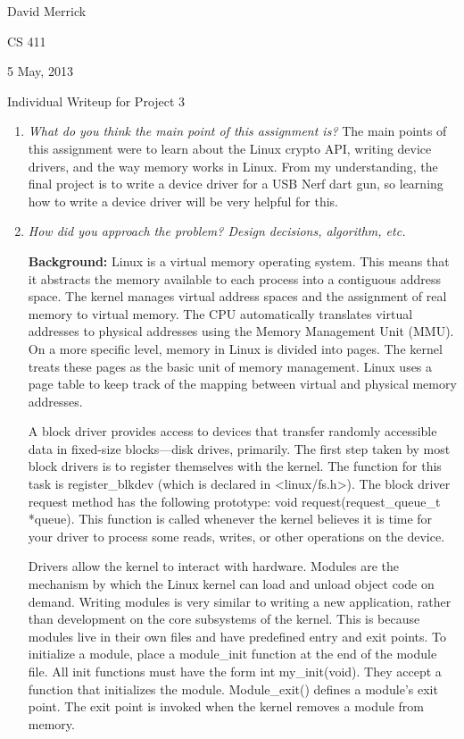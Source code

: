 \documentclass[letterpaper,10pt,titlepage]{article}
\newcommand{\ignore}[2]{\hspace{0in}#2} %
\newcommand{\tab}{\hspace*{2em}} %
\def\name{David Merrick}
\def\project{Project 3}
\def\date{5 May, 2013}
\begin{document}
\name

CS 411

\date

\begin{center}
{\LARGE Individual Writeup for \project}
\end{center}

\begin{enumerate} 
\item \emph{What do you think the main point of this assignment is?}
The main points of this assignment were to learn about the Linux crypto API, writing device drivers, and the way memory works in Linux. From my understanding, the final project is to write a device driver for a USB Nerf dart gun, so learning how to write a device driver will be very helpful for this.

\item \emph{How did you approach the problem? Design decisions, algorithm, etc.}

\tab \textbf{Background:} 
\tab Linux is a virtual memory operating system. This means that it abstracts the memory available to each process into a contiguous address space. The kernel manages virtual address spaces and the assignment of real memory to virtual memory. The CPU automatically translates virtual addresses to physical addresses using the Memory Management Unit (MMU)\ignore{source:http://en.wikipedia.org/wiki/Virtual_memory}. On a more specific level, memory in Linux is divided into pages. The kernel treats these pages as the basic unit of memory management\ignore{source:Love pg. 231}. Linux uses a page table to keep track of the mapping between virtual and physical memory addresses.

\tab A block driver provides access to devices that transfer randomly accessible data in fixed-size blocks—disk drives, primarily. The first step taken by most block drivers is to register themselves with the kernel. The function for this task is register\_blkdev (which is declared in <linux/fs.h>). The block driver request method has the following prototype: void request(request_queue_t *queue). This function is called whenever the kernel believes it is time for your driver to process some reads, writes, or other operations on the device\ignore{source: http://lwn.net/images/pdf/LDD3/ch16.pdf}. 

\tab Drivers allow the kernel to interact with hardware. Modules are the mechanism by which the Linux kernel can load and unload object code on demand. Writing modules is very similar to writing a new application, rather than development on the core subsystems of the kernel. This is because modules live in their own files and have predefined entry and exit points. To initialize a module, place a module\_init function at the end of the module file. All init functions must have the form int my_init(void). They accept a function that initializes the module. Module\_exit() defines a module's exit point. The exit point is invoked when the kernel removes a module from memory\ignore{source: Love, pg 339}. 


\end{enumerate}
\end{document}
